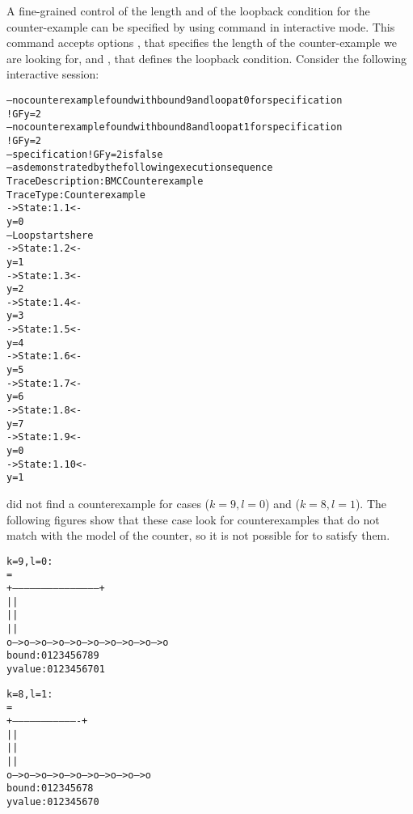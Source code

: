 A fine-grained control of the length and of the loopback condition for
the counter-example can be specified by using command
 in interactive mode. This command accepts options , that specifies the length of the
counter-example we are looking for, and , that defines the
loopback condition. Consider the following interactive session:
\begin{alltt}
\shellprompt {}
\nusmvprompt {}
\nusmvprompt {}
-- no counterexample found with bound 9 and loop at 0 for specification 
   ! G  F y = 2
\nusmvprompt {}
-- no counterexample found with bound 8 and loop at 1 for specification 
   ! G  F y = 2
\nusmvprompt {}
-- specification ! G  F y = 2   is false
-- as demonstrated by the following execution sequence
Trace Description: BMC Counterexample
Trace Type: Counterexample
-> State: 1.1 <-
  y = 0
-- Loop starts here
-> State: 1.2 <-
  y = 1
-> State: 1.3 <-
  y = 2
-> State: 1.4 <-
  y = 3
-> State: 1.5 <-
  y = 4
-> State: 1.6 <-
  y = 5
-> State: 1.7 <-
  y = 6
-> State: 1.8 <-
  y = 7
-> State: 1.9 <-
  y = 0
-> State: 1.10 <-
  y = 1
\nusmvprompt {}
\shellprompt
\end{alltt}

\nusmv did not find a counterexample for cases ($k=9, l=0$) and
($k=8, l=1$). The following figures show that these case look for
counterexamples that do not match with the model of the counter, so it
is not possible for \nusmv to satisfy them.
\begin{alltt}
k = 9, l = 0:
                                =
         +--------------------------------------------+
         |                                            |
         |                                            |
         |                                            |
         o--->o--->o--->o--->o--->o--->o--->o--->o--->o
bound:   0    1    2    3    4    5    6    7    8    9
y value: 0    1    2    3    4    5    6    7    0    1
          
\end{alltt}

\begin{alltt}
k = 8, l = 1:
                             =
              +----------------------------------+
              |                                  |
              |                                  |
              |                                  |
         o--->o--->o--->o--->o--->o--->o--->o--->o
bound:   0    1    2    3    4    5    6    7    8
y value: 0    1    2    3    4    5    6    7    0
\end{alltt}

